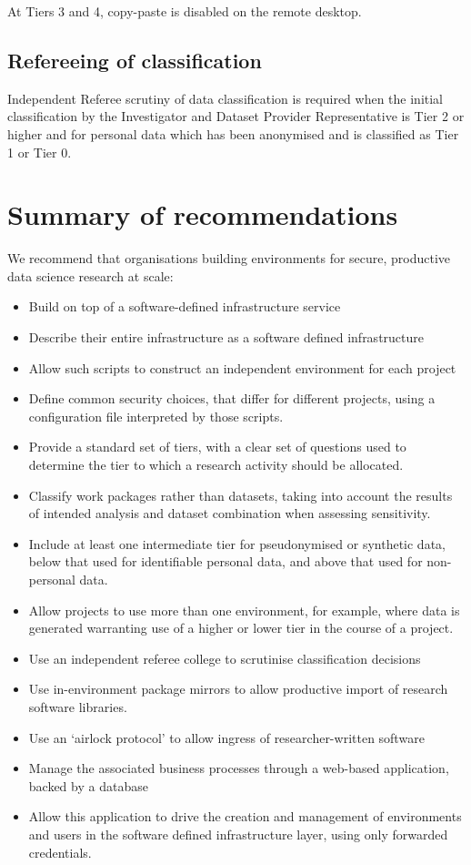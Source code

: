 \documentclass[10pt,a4paper,twocolumn]{article}
\begin{document}
At Tiers 3 and 4, copy-paste is disabled on the remote desktop.

\subsection{Refereeing of classification}

Independent Referee scrutiny of data classification is required when the initial classification
by the Investigator and Dataset Provider Representative is Tier 2 or higher and for personal data which has been anonymised and is classified as Tier 1 or Tier 0.

\section{Summary of recommendations}

We recommend that organisations building environments for secure, productive data science research at scale:

\begin{itemize}
    \item Build on top of a software-defined infrastructure service
    \item Describe their entire infrastructure as a software defined infrastructure
    \item Allow such scripts to construct an independent environment for each project
    \item Define common security choices, that differ for different projects, using a configuration file interpreted by those scripts.
    \item Provide a standard set of tiers, with a clear set of questions used to determine the tier to which a
    research activity should be allocated.
    \item Classify work packages rather than datasets, taking into account the results of intended analysis and dataset combination when assessing sensitivity.
    \item Include at least one intermediate tier for pseudonymised or synthetic data, below that used for identifiable personal data, and above that used for non-personal data.
    \item Allow projects to use more than one environment, for example, where data is generated warranting use of a higher or lower tier in the course of a project.
    \item Use an independent referee college to scrutinise classification decisions
    \item Use in-environment package mirrors to allow productive import of research software libraries.
    \item Use an `airlock protocol' to allow ingress of researcher-written software
    \item Manage the associated business processes through a web-based application, backed by a database
    \item Allow this application to drive the creation and management of environments and users in the software
    defined infrastructure layer, using only forwarded credentials.
\end{itemize}
\end{document}
